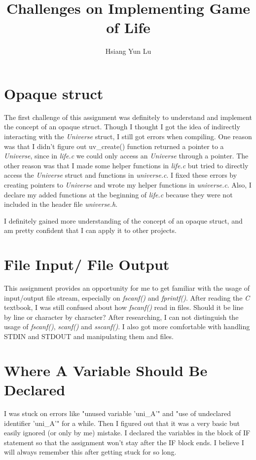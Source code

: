 \documentclass[12pt]{article}
\title{Challenges on Implementing Game of Life}
\author{Hsiang Yun Lu}
\begin{document}
\maketitle

\section{Opaque struct}

The first challenge of this assignment was definitely to understand and implement the concept of an opaque struct. Though I thought I got the idea of indirectly interacting with the \textit{Universe} struct, I still got errors when compiling. One reason was that I didn't figure out uv\_create() function returned a pointer to a \textit{Universe}, since in \textit{life.c} we could only access an \textit{Universe} through a pointer. The other reason was that I made some helper functions in \textit{life.c} but tried to directly access the \textit{Universe} struct and functions in \textit{universe.c}. I fixed these errors by creating pointers to \textit{Universe} and wrote my helper functions in \textit{universe.c}. Also, I declare my added functions at the beginning of \textit{life.c} because they were not included in the header file \textit{universe.h}.

I definitely gained more understanding of the concept of an opaque struct, and am pretty confident that I can apply it to other projects.

\section{File Input/ File Output}

This assignment provides an opportunity for me to get familiar with the usage of input/output file stream, especially on \textit{fscanf()} and \textit{fprintf()}. After reading the \textit{C} textbook, I was still confused about how \textit{fscanf()} read in files. Should it be line by line or character by character? After researching, I can not distinguish the usage of \textit{fscanf()}, \textit{scanf()} and \textit{sscanf()}. I also got more comfortable with handling STDIN and STDOUT and manipulating them and files. 

\section{Where A Variable Should Be Declared}

I was stuck on errors like "unused variable 'uni\_A'" and "use of undeclared identifier 'uni\_A'" for a while. Then I figured out that it was a very basic but easily ignored (or only by me) mistake. I declared the variables in the block of IF statement so that the assignment won't stay after the IF block ends. I believe I will always remember this after getting stuck for so long.
\end{document}
